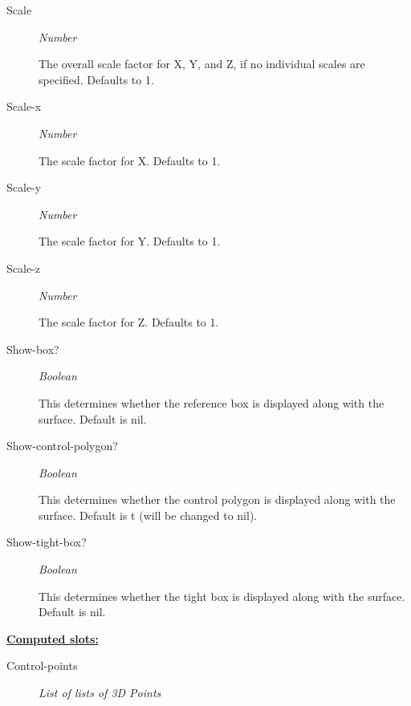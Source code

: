 \documentclass [11pt]{book}
\begin{document}
\begin{itemize}
\begin{description}
\item [Scale]
\emph{Number}

 The overall scale factor for X, Y, and Z, if no individual scales are specified. Defaults to 1.




\item [Scale-x]
\emph{Number}

 The scale factor for X. Defaults to 1.




\item [Scale-y]
\emph{Number}

 The scale factor for Y. Defaults to 1.




\item [Scale-z]
\emph{Number}

 The scale factor for Z. Defaults to 1.




\item [Show-box?]
\emph{Boolean}

 This determines whether the reference box is displayed along with the surface. Default is nil.




\item [Show-control-polygon?]
\emph{Boolean}

 This determines whether the control polygon is displayed along with the surface. Default is t (will be changed to nil).




\item [Show-tight-box?]
\emph{Boolean}

 This determines whether the tight box is displayed along with the surface. Default is nil.




\end{description}






\textbf{
\underline{Computed slots:}}

\begin{description}

\item [Control-points]
\emph{List of lists of 3D Points}


\end{description}
\end{itemize}
\end{document}
